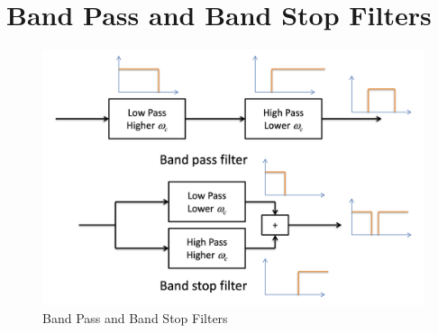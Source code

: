 \documentclass[oneside]{book}
\begin{document}
            \section{Band Pass and Band Stop Filters}
                \begin{figure}[H]
                    \centering
                    \includegraphics[width=0.6\linewidth]{figures/band_pass_stop.png}
                    \caption{Band Pass and Band Stop Filters}
                \end{figure}
        \listoffigures
\end{document}
